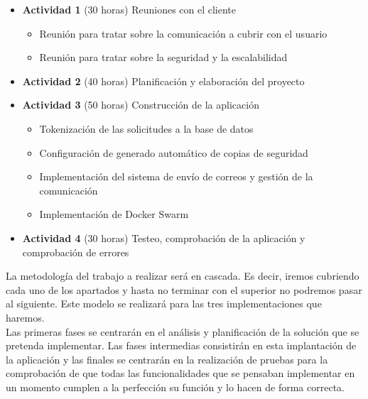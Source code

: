 \begin{itemize}
    \item \textbf{Actividad 1} (30 horas) Reuniones con el cliente
    \begin{itemize}
        \item Reunión para tratar sobre la comunicación a cubrir con el usuario
        \item Reunión para tratar sobre la seguridad y la escalabilidad
    \end{itemize}
    \item \textbf{Actividad 2} (40 horas) Planificación y elaboración del proyecto
    \item \textbf{Actividad 3} (50 horas) Construcción de la aplicación
    \begin{itemize}
        \item Tokenización de las solicitudes a la base de datos
        \item Configuración de generado automático de copias de seguridad
        \item Implementación del sistema de envío de correos y gestión de la comunicación
        \item Implementación de Docker Swarm
    \end{itemize}
    \item \textbf{Actividad 4} (30 horas) Testeo, comprobación de la aplicación y comprobación de errores
\end{itemize}

La metodología del trabajo a realizar será en cascada. Es decir, iremos cubriendo cada uno de los apartados y hasta no terminar con el superior no podremos pasar al siguiente. Este modelo se realizará para las tres implementaciones que haremos.
\\Las primeras fases se centrarán en el análisis y planificación de la solución que se pretenda implementar. Las fases intermedias consistirán en esta implantación de la aplicación y las finales se centrarán en la realización de pruebas para la comprobación de que todas las funcionalidades que se pensaban implementar en un momento cumplen a la perfección su función y lo hacen de forma correcta.